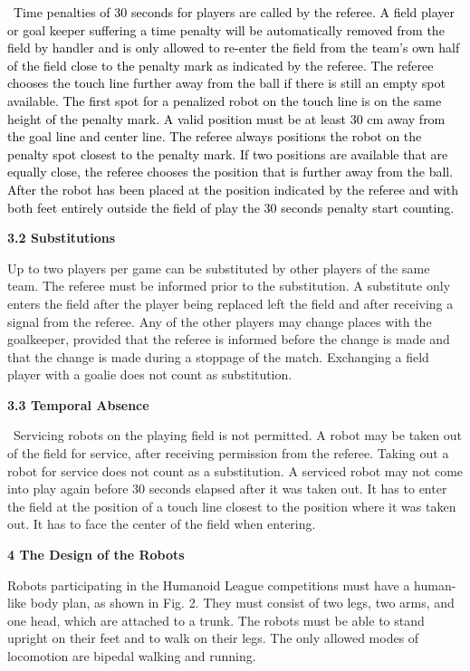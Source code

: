 \documentclass[a4paper]{article}
\begin{document}
\textcolor{black}{\ Time penalties of 30 seconds for players are called by the referee. A field player or goal keeper
suffering a time penalty will be automatically removed from the field by handler and is only allowed to re-enter the
field from the team's own half of the field close to the penalty mark as indicated by the referee. The referee chooses
the touch line further away from the ball if there is still an empty spot available. The first spot for a penalized
robot on the touch line is on the same height of the penalty mark. A valid position must be at least 30 cm away from
the goal line and center line. The referee always positions the robot on the penalty spot closest to the penalty mark.
If two positions are available that are equally close, the referee chooses the position that is further away from the
ball. After the robot has been placed at the position indicated by the referee and with both feet entirely outside the
field of play the 30 seconds penalty start counting.}


\bigskip

\textbf{3.2 Substitutions}

Up to two players per game can be substituted by other players of the same team. The referee must be informed prior to
the substitution. A substitute only enters the field after the player being replaced left the field and after receiving
a signal from the referee. Any of the other players may change places with the goalkeeper, provided that the referee is
informed before the change is made and that the change is made during a stoppage of the match. Exchanging a field
player with a goalie does not count as substitution.

\textbf{3.3 Temporal Absence}

\ Servicing robots on the playing field is not permitted. A robot may be taken out of the field for service, after
receiving permission from the referee. Taking out a robot for service does not count as a substitution. A serviced
robot may not come into play again before 30 seconds elapsed after it was taken out. It has to enter the field at the
position of a touch line closest to the position where it was taken out. It has to face the center of the field when
entering.

\bigskip

\textbf{4 The Design of the Robots}

Robots participating in the Humanoid League competitions must have a human-like body plan, as shown in Fig. 2. They must
consist of two legs, two arms, and one head, which are attached to a trunk. The robots must be able to stand upright on
their feet and to walk on their legs. The only allowed modes of locomotion are bipedal walking and running.
\end{document}
